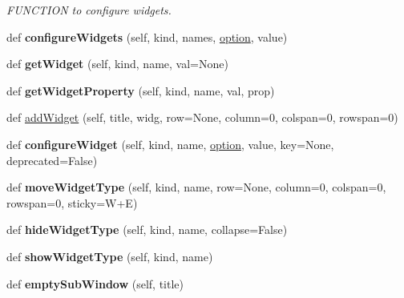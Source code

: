 \begin{DoxyCompactItemize}
\begin{DoxyCompactList}\small\item\em F\+U\+N\+C\+T\+I\+ON to configure widgets. \end{DoxyCompactList}\item 
\mbox{\label{classappjar_1_1gui_acebfd92bdf8d3d0afa996d9c50ff60b0}} 
def {\bfseries configure\+Widgets} (self, kind, names, \hyperlink{classappjar_1_1gui_a641fb93f7f581e3fdd4357736f256f2c}{option}, value)
\item 
\mbox{\label{classappjar_1_1gui_a783e8aca3367baf44293592081688231}} 
def {\bfseries get\+Widget} (self, kind, name, val=None)
\item 
\mbox{\label{classappjar_1_1gui_a224e37debe6c4aec0204e6cd1fc1858e}} 
def {\bfseries get\+Widget\+Property} (self, kind, name, val, prop)
\item 
def \hyperlink{classappjar_1_1gui_a217dd64635f6be53036ea9ebdc860aca}{add\+Widget} (self, title, widg, row=None, column=0, colspan=0, rowspan=0)
\item 
\mbox{\label{classappjar_1_1gui_a85b6bd21539e2329938ad4585cf8ecb6}} 
def {\bfseries configure\+Widget} (self, kind, name, \hyperlink{classappjar_1_1gui_a641fb93f7f581e3fdd4357736f256f2c}{option}, value, key=None, deprecated=False)
\item 
\mbox{\label{classappjar_1_1gui_ac6cf713265f1480c125074d1abe8a3ef}} 
def {\bfseries move\+Widget\+Type} (self, kind, name, row=None, column=0, colspan=0, rowspan=0, sticky=W+E)
\item 
\mbox{\label{classappjar_1_1gui_a4eb87dddd4a0cdf27efb181e3c3a5d56}} 
def {\bfseries hide\+Widget\+Type} (self, kind, name, collapse=False)
\item 
\mbox{\label{classappjar_1_1gui_af390a18a64e48c382320d1faf0efc69d}} 
def {\bfseries show\+Widget\+Type} (self, kind, name)
\item 
\mbox{\label{classappjar_1_1gui_ae95fe6aae656b5b73f26cc61f74eec91}} 
def {\bfseries empty\+Sub\+Window} (self, title)
\item 

\end{DoxyCompactItemize}
